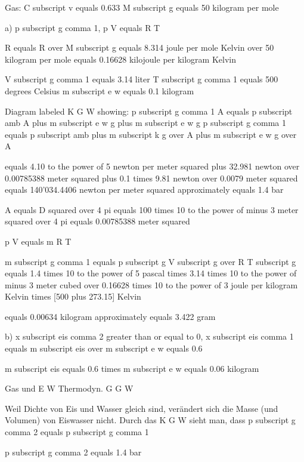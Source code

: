 Gas: C subscript v equals 0.633  
M subscript g equals 50 kilogram per mole  

a) p subscript g comma 1, p V equals R T  

R equals R over M subscript g equals 8.314 joule per mole Kelvin over 50 kilogram per mole equals 0.16628 kilojoule per kilogram Kelvin  

V subscript g comma 1 equals 3.14 liter  
T subscript g comma 1 equals 500 degrees Celsius  
m subscript e w equals 0.1 kilogram  

Diagram labeled K G W showing:  
p subscript g comma 1 A equals p subscript amb A plus m subscript e w g plus m subscript e w g  
p subscript g comma 1 equals p subscript amb plus m subscript k g over A plus m subscript e w g over A  

equals 4.10 to the power of 5 newton per meter squared plus 32.981 newton over 0.00785388 meter squared plus 0.1 times 9.81 newton over 0.0079 meter squared equals 140'034.4406 newton per meter squared approximately equals 1.4 bar  

A equals D squared over 4 pi equals 100 times 10 to the power of minus 3 meter squared over 4 pi equals 0.00785388 meter squared  

p V equals m R T  

m subscript g comma 1 equals p subscript g V subscript g over R T subscript g equals 1.4 times 10 to the power of 5 pascal times 3.14 times 10 to the power of minus 3 meter cubed over 0.16628 times 10 to the power of 3 joule per kilogram Kelvin times [500 plus 273.15] Kelvin  

equals 0.00634 kilogram approximately equals 3.422 gram  

b) x subscript eis comma 2 greater than or equal to 0, x subscript eis comma 1 equals m subscript eis over m subscript e w equals 0.6  

m subscript eis equals 0.6 times m subscript e w equals 0.06 kilogram  

Gas und E W Thermodyn. G G W  

Weil Dichte von Eis und Wasser gleich sind, verändert sich die Masse (und Volumen) von Eiswasser nicht. Durch das K G W sieht man, dass p subscript g comma 2 equals p subscript g comma 1  

p subscript g comma 2 equals 1.4 bar